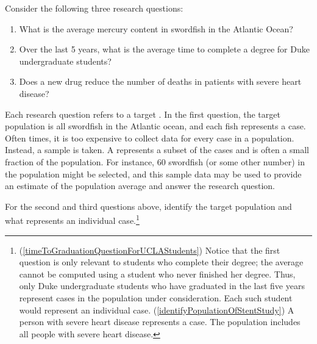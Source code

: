 Consider the following three research questions:
\begin{enumerate}
\setlength{\itemsep}{0mm}
\item What is the average mercury content in swordfish in the Atlantic Ocean?
\item\label{timeToGraduationQuestionForUCLAStudents} Over the last 5 years, what is the average time to complete a degree for Duke undergraduate students?
\item\label{identifyPopulationOfStentStudy} Does a new drug reduce the number of deaths in patients with severe heart disease?
\end{enumerate}
Each research question refers to a target . In the first question, the target population is all swordfish in the Atlantic ocean, and each fish represents a case. Often times, it is too expensive to collect data for every case in a population. Instead, a sample is taken. A  represents a subset of the cases and is often a small fraction of the population. For instance, 60 swordfish (or some other number) in the population might be selected, and this sample data may be used to provide an estimate of the population average and answer the research question.

\begin{exercise} \label{identifyingThePopulationForTwoQuestionsInPopAndSampSubsection}
For the second and third questions above, identify the target population and what represents an individual case.\footnote{(\ref{timeToGraduationQuestionForUCLAStudents}) Notice that the first question is only relevant to students who complete their degree; the average cannot be computed using a student who never finished her degree. Thus, only Duke undergraduate students who have graduated in the last five years represent cases in the population under consideration. Each such student would represent an individual case. (\ref{identifyPopulationOfStentStudy}) A person with severe heart disease represents a case. The population includes all people with severe heart disease.}
\end{exercise}

